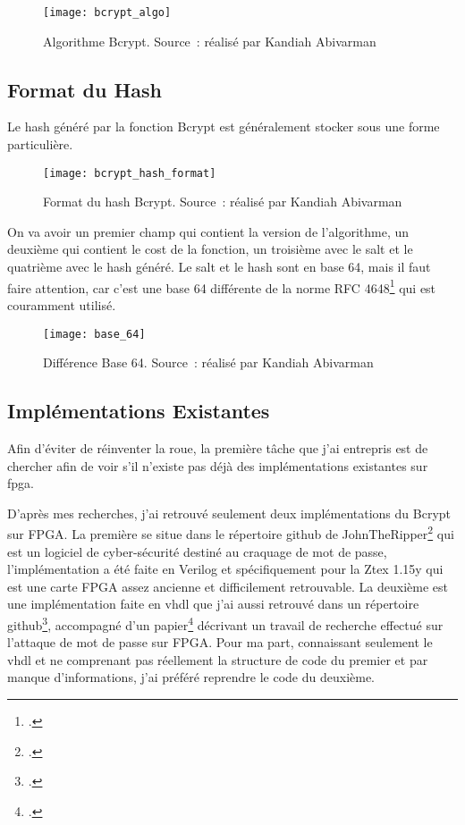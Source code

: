 \begin{figure}[tbph!]
	\centering
	\texttt{[image: bcrypt\_algo]}
	\caption[Algorithme Bcrypt]{Algorithme Bcrypt. Source : réalisé par Kandiah Abivarman}
	\label{fig:bcrypt_algo}
\end{figure}

\newpage

\subsection{Format du Hash}

Le hash généré par la fonction Bcrypt est généralement stocker sous une forme particulière. 

\begin{figure}[tbph!]
	\centering
	\texttt{[image: bcrypt\_hash\_format]}
	\caption[Format du hash Bcrypt]{Format du hash Bcrypt. Source : réalisé par Kandiah Abivarman}
	\label{fig:bcrypt_hash_format}
\end{figure}

On va avoir un premier champ qui contient la version de l'algorithme, un deuxième qui contient le cost de la fonction, un troisième avec le salt et le quatrième avec le hash généré. 
Le salt et le hash sont en base 64, mais il faut faire attention, car c'est une base 64 différente de la norme RFC 4648\footcite{josefsson_base16_2006} qui est couramment utilisé.

\begin{figure}[tbph!]
	\centering
	\texttt{[image: base\_64]}
	\caption[Différence Base 64]{Différence Base 64. Source : réalisé par Kandiah Abivarman}
	\label{fig:base_64}
\end{figure}

\subsection{Implémentations Existantes}

Afin d'éviter de réinventer la roue, la première tâche que j'ai entrepris est de chercher afin de voir s'il n'existe pas déjà des implémentations existantes sur \gls{fpga}. 

D'après mes recherches, j'ai retrouvé seulement deux implémentations du Bcrypt sur FPGA. 
La première se situe dans le répertoire github de JohnTheRipper\footcite{noauthor_openwalljohn_2024} qui est un logiciel de cyber-sécurité destiné au craquage de mot de passe, l'implémentation a été faite en Verilog et spécifiquement pour la Ztex 1.15y qui est une carte FPGA assez ancienne et difficilement retrouvable. 
La deuxième est une implémentation faite en \gls{vhdl} que j'ai aussi retrouvé dans un répertoire github\footcite{noauthor_rub-hgihigh-speed_bcrypt_nodate}, accompagné d'un papier\footcite{wiemer_high-speed_2014} décrivant un travail de recherche effectué sur l'attaque de mot de passe sur FPGA. 
Pour ma part, connaissant seulement le \gls{vhdl} et ne comprenant pas réellement la structure de code du premier et par manque d'informations, j'ai préféré reprendre le code du deuxième. 


